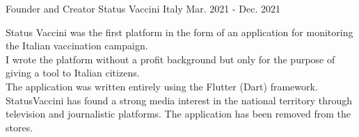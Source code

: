 
\begin{cventries}

  \cventry
    {Founder and Creator} %
    {Status Vaccini} %
    {Italy} %
    {Mar. 2021 - Dec. 2021} %
    {
      \begin{cvitems} %
        \item {Status Vaccini was the first platform in the form of an application for monitoring the Italian vaccination campaign.\\
        I wrote the platform without a profit background but only for the purpose of giving a tool to Italian citizens.\\
        The application was written entirely using the Flutter (Dart) framework. StatusVaccini has found a strong media interest
        in the national territory through television and journalistic platforms. The application has been removed from the stores.}
      \end{cvitems}
    }

\end{cventries}
